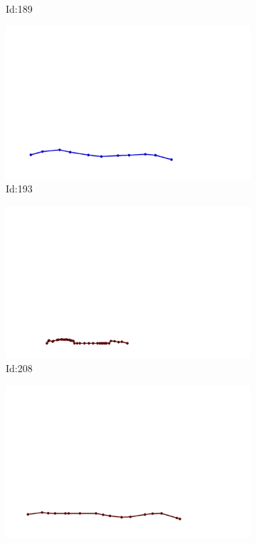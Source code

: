\documentclass[12pt,twoside]{report}
\begin{document}
\begin{figure}
\begin{subfigure}[b]{0.20\textwidth}
\caption{Id:189}
\end{subfigure}
\begin{subfigure}[b]{0.20\textwidth}
\centering
\includegraphics[width=\textwidth]{../trajectories/193.png}
\caption{Id:193}
\end{subfigure}
\begin{subfigure}[b]{0.20\textwidth}
\centering
\includegraphics[width=\textwidth]{../trajectories/208.png}
\caption{Id:208}
\end{subfigure}
\begin{subfigure}[b]{0.20\textwidth}
\centering
\includegraphics[width=\textwidth]{../trajectories/236.png}

\end{subfigure}
\end{figure}
\end{document}
